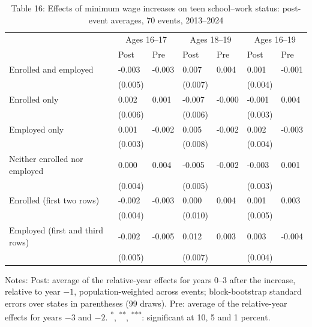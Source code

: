 \documentclass[12pt]{article}
\begin{document}
\begin{table}
\centering
\caption{Table 16: Effects of minimum wage increases on teen school--work status: post-event averages, 70 events, 2013--2024}

\small
\begin{tabular}{p{}p{}p{}p{}p{}p{}p{}}
\toprule
 & \multicolumn{2}{c}{Ages 16--17} & \multicolumn{2}{c}{Ages 18--19} & \multicolumn{2}{c}{Ages 16--19} \\

 & Post & Pre & Post & Pre & Post & Pre \\
\midrule
Enrolled and employed & -0.003 & -0.003 & 0.007 & 0.004 & 0.001 & -0.001 \\
 & (0.005) &  & (0.007) &  & (0.004) &  \\
Enrolled only & 0.002 & 0.001 & -0.007 & -0.000 & -0.001 & 0.004 \\
 & (0.006) &  & (0.006) &  & (0.003) &  \\
Employed only & 0.001 & -0.002 & 0.005 & -0.002 & 0.002 & -0.003 \\
 & (0.003) &  & (0.008) &  & (0.004) &  \\
Neither enrolled nor employed & 0.000 & 0.004 & -0.005 & -0.002 & -0.003 & 0.001 \\
 & (0.004) &  & (0.005) &  & (0.003) &  \\
Enrolled (first two rows) & -0.002 & -0.003 & 0.000 & 0.004 & 0.001 & 0.003 \\
 & (0.004) &  & (0.010) &  & (0.005) &  \\
Employed (first and third rows) & -0.002 & -0.005 & 0.012 & 0.003 & 0.003 & -0.004 \\
 & (0.005) &  & (0.007) &  & (0.004) &  \\
\bottomrule
\end{tabular}



\noindent\small Notes: Post: average of the relative-year effects for years 0--3 after the increase, relative to year $-1$, population-weighted across events; block-bootstrap standard errors over states in parentheses (99 draws). Pre: average of the relative-year effects for years $-3$ and $-2$. \textsuperscript{*}, \textsuperscript{**}, \textsuperscript{***}: significant at 10, 5 and 1 percent.

\end{table}
\end{document}
